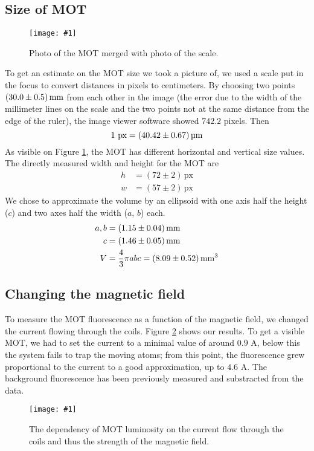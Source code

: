 \documentclass[twocolumn]{article}
\newcommand{\insertFigure}[1]{%
   \texttt{[image: \#1]}%
}
\begin{document}
\subsection{Size of MOT}
\begin{figure}
\centering
\insertFigure{Images/MOT_w_scale_crop.png}
\caption{Photo of the MOT merged with photo of the scale.}
\label{fig:mot_w_scale}
\end{figure}
To get an estimate on the MOT size we took a picture of, we used a scale put in the focus to convert distances in pixels to centimeters. By choosing two points $\SI[separate-uncertainty = true]{30.0 \pm 0.5 }{\milli\meter}$ from each other in the image (the error due to the width of the millimeter lines on the scale and the two points not at the same distance from the edge of the ruler), the image viewer software showed $742.2$ pixels. Then
\begin{equation}
1 \text{~px} = \SI[separate-uncertainty = true]{40.42 \pm 0.67}{\micro\meter} \nonumber
\end{equation}
As visible on Figure \ref{fig:mot_w_scale}, the MOT has different horizontal and vertical size values. The directly measured width and height for the MOT are
\begin{align*}
h &= (72 \pm 2)  \, \text{px}\\
w &= (57 \pm 2)  \, \text{px} 
\end{align*}
We chose to approximate the volume by an ellipsoid with one axis half the height ($c$) and two axes half the width ($a$, $b$) each.
\begin{align*}
a, b &= \SI[separate-uncertainty = true]{1.15 \pm 0.04}{\milli\meter} \\
c &=  \SI[separate-uncertainty = true]{1.46 \pm 0.05}{\milli\meter} \\
V &= \frac{4}{3} \pi a b c = \SI[separate-uncertainty = true]{8.09 \pm 0.52 }{\cubic\milli\meter}
\end{align*}
\subsection{Changing the magnetic field}
To measure the MOT fluorescence as a function of the magnetic field, we changed the current flowing through the coils. Figure \ref{fig:magnetic} shows our results. To get a visible MOT, we had to set the current to a minimal value of around $0.9$ A, below this the system fails to trap the moving atoms; from this point, the fluorescence grew proportional to the current to a good approximation, up to $4.6$ A. The background fluorescence has been previously measured and substracted from the data.
\begin{figure}
\centering
\insertFigure{Images/magnetic_dependence_wo_linear.png}
\caption{The dependency of MOT luminosity on the current flow through the coils and thus the strength of the magnetic field.}
\label{fig:magnetic}
\end{figure}
\end{document}
